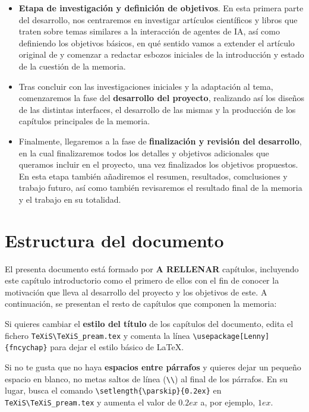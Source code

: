\begin{itemize}
	
	\item \textbf{Etapa de investigación y definición de objetivos}. En esta primera parte del desarrollo, nos centraremos en investigar artículos científicos y libros que traten sobre temas similares a la interacción de agentes de IA, así como definiendo los objetivos básicos, en qué sentido vamos a extender el artículo original de \ga y comenzar a redactar esbozos iniciales de la introducción y estado de la cuestión de la memoria.
	
	\item Tras concluir con las investigaciones iniciales y la adaptación al tema, comenzaremos la fase del \textbf{desarrollo del proyecto}, realizando así los diseños de las distintas interfaces, el desarrollo de las mismas y la producción de los capítulos principales de la memoria.
	
	\item Finalmente, llegaremos a la fase de \textbf{finalización y revisión del desarrollo}, en la cual finalizaremos todos los detalles y objetivos adicionales que queramos incluir en el proyecto, una vez finalizados los objetivos propuestos. En esta etapa también añadiremos el resumen, resultados, comclusiones y trabajo futuro, así como también revisaremos el resultado final de la memoria y el trabajo en su totalidad.
\end{itemize}



\section{Estructura del documento}
El presenta documento está formado por  \textbf{A RELLENAR}  capítulos, incluyendo este capítulo introductorio como el primero de ellos con el fin de conocer la motivación que lleva al desarrollo del proyecto y los objetivos de este. A continuación, se presentan el resto de capítulos que componen la memoria: 

Si quieres cambiar el \textbf{estilo del título} de los capítulos del documento, edita el fichero \verb|TeXiS\TeXiS_pream.tex| y comenta la línea \verb|\usepackage[Lenny]{fncychap}| para dejar el estilo básico de \LaTeX.

Si no te gusta que no haya \textbf{espacios entre párrafos} y quieres dejar un pequeño espacio en blanco, no metas saltos de línea (\verb|\\|) al final de los párrafos. En su lugar, busca el comando  \verb|\setlength{\parskip}{0.2ex}| en \verb|TeXiS\TeXiS_pream.tex| y aumenta el valor de $0.2ex$ a, por ejemplo, $1ex$.

